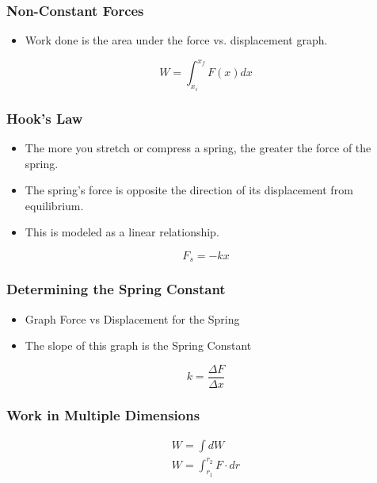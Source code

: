 \documentclass[12pt]{article}
\theoremstyle{break}
\numberwithin{theorem}{subsection}
\numberwithin{lemma}{subsection}
\numberwithin{corollary}{subsection}
\numberwithin{equation}{subsection}
\begin{document}
\subsubsection{Non-Constant Forces}
\begin{itemize}
	\item Work done is the area under the force vs. displacement graph.
\end{itemize}
\begin{equation*}
W = \int_{x_i}^{x_f} F(x)dx
\end{equation*}

\subsubsection{Hook's Law}
\begin{itemize}
	\item The more you stretch or compress a spring, the greater the force of the spring.
	\item The spring's force is opposite the direction of its displacement from equilibrium.
	\item This is modeled as a linear relationship.
\end{itemize}
\begin{equation*}
F_s = -k x
\end{equation*}

\subsubsection{Determining the Spring Constant}
\begin{itemize}
	\item Graph Force vs Displacement for the Spring
	\item The slope of this graph is the Spring Constant
\end{itemize}
\begin{equation*}
k = \frac{\Delta F}{\Delta x}
\end{equation*}

\subsubsection{Work in Multiple Dimensions}
\begin{align*}
W = \int dW \\
W = \int_{r_1}^{r_2} F \cdot dr 
\end{align*}
\end{document}
